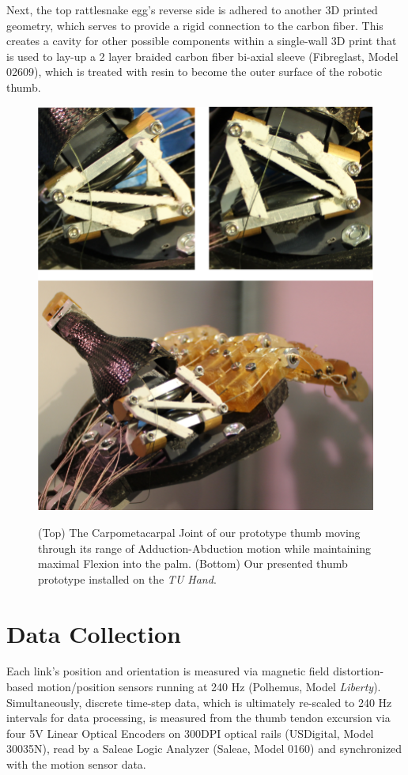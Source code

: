 \documentclass[letterpaper, 10 pt, conference]{ieeeconf}
\begin{document}
 Next, the top rattlesnake egg's reverse side is adhered to another 3D printed geometry, which serves to provide a rigid connection to the carbon fiber. This creates a cavity for other possible components within a single-wall 3D print that is used to lay-up a 2 layer braided carbon fiber bi-axial sleeve (Fibreglast, Model 02609), which is treated with resin to become the outer surface of the robotic thumb. 

\begin{figure}
    \centering
	\vspace{7pt}
	{\includegraphics[width = 1\columnwidth]{Figures/garp.png}\label{overload}}\\
	\caption{(Top) The Carpometacarpal Joint of our prototype thumb moving through its range of Adduction-Abduction motion while maintaining maximal Flexion into the palm.
	(Bottom) Our presented thumb prototype installed on the \textit{TU Hand}. }\label{workspaces}
    \vspace{-6pt}
\end{figure}

\section{Data Collection}
Each link's position and orientation is measured via magnetic field distortion-based motion/position sensors running at 240 Hz (Polhemus, Model \textit{Liberty}). Simultaneously, discrete time-step data, which is ultimately re-scaled to 240 Hz intervals for data processing, is measured from the thumb tendon excursion via four 5V Linear Optical Encoders on 300DPI optical rails (USDigital, Model 30035N), read by a Saleae Logic Analyzer (Saleae, Model 0160) and synchronized with the motion sensor data.
\end{document}
